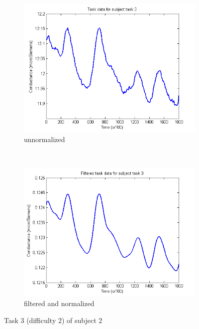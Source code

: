 \documentclass[11pt,leqno,a4paper]{report} %
\begin{document}

\begin{figure}[h!]
\hspace*{-.2\textwidth}        \centering
        \begin{subfigure}[b]{0.7\textwidth}
                \includegraphics[width=\textwidth]{measurements/singletaskunnormal.png}
                \caption{unnormalized}
                \label{fig:gull}
        \end{subfigure}%
        ~ %
        \begin{subfigure}[b]{0.7\textwidth}
                \includegraphics[width=\textwidth]{measurements/singletaskfilt.png}
                \caption{filtered and normalized}
                \label{fig:tiger}
        \end{subfigure}
        \caption{Task 3 (difficulty 2) of subject 2}\label{fig:animals}
\end{figure}
\end{document}
